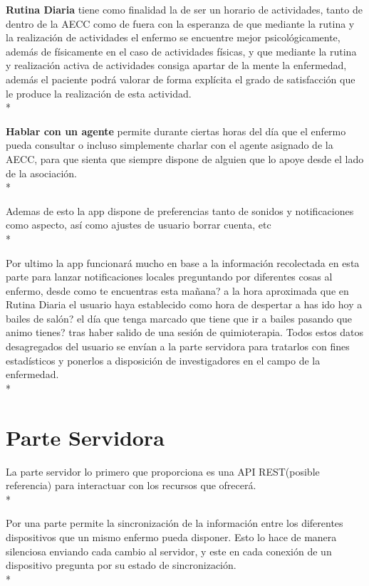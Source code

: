 \documentclass[../pfc.tex]{subfiles}
\begin{document}
	\textbf{Rutina Diaria} tiene como finalidad la de ser un horario de actividades, tanto de dentro de la AECC como de fuera con la esperanza de que mediante la rutina y la realización de actividades el enfermo se encuentre mejor psicológicamente, además de físicamente en el caso de actividades físicas, y que mediante la rutina y realización activa de actividades consiga apartar de la mente la enfermedad, además el paciente podrá valorar de forma explícita el grado de satisfacción que le produce la realización de esta actividad.\\*
	
	\textbf{Hablar con un agente} permite durante ciertas horas del día que el enfermo pueda consultar o incluso simplemente charlar con el agente asignado de la AECC, para que sienta que siempre dispone de alguien que lo apoye desde el lado de la asociación.\\*
	  
	Ademas de esto la app dispone de preferencias tanto de sonidos y notificaciones como aspecto, así como ajustes de usuario borrar cuenta, etc\\*
	
	Por ultimo la app funcionará mucho en base a la información recolectada en esta parte para lanzar notificaciones locales preguntando por diferentes cosas al enfermo, desde como te encuentras esta mañana? a la hora aproximada que en Rutina Diaria el usuario haya establecido como hora de despertar a has ido hoy a bailes de salón? el día que tenga marcado que tiene que ir a bailes pasando que animo tienes? tras haber salido de una sesión de quimioterapia. Todos estos datos desagregados del usuario se envían a la parte servidora para tratarlos con fines estadísticos y ponerlos a disposición de investigadores en el campo de la enfermedad.\\*
	
	\section{Parte Servidora}
	
	La parte servidor lo primero que proporciona es una API REST(posible referencia) para interactuar con los recursos que ofrecerá.\\*
	
	Por una parte permite la sincronización de la información entre los diferentes dispositivos  que un mismo enfermo pueda disponer. Esto lo hace de manera silenciosa enviando cada cambio al servidor, y este en cada conexión de un dispositivo pregunta por su estado de sincronización.\\*
	
\end{document}
